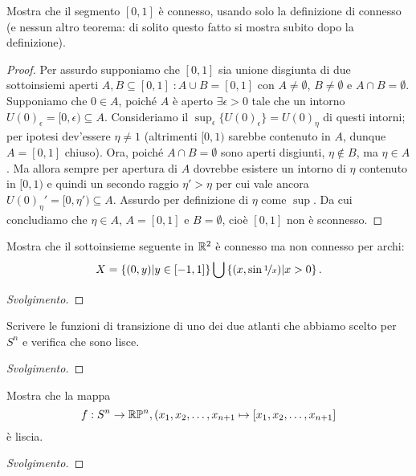 \documentclass{article}[a4paper, 12pt, italian]
\begin{document}
\begin{exercise}
Mostra che il segmento $[0, 1]$ è connesso, usando solo la definizione di
connesso (e nessun altro teorema: di solito questo fatto si mostra subito dopo
la definizione).
\begin{proof}
Per assurdo supponiamo che $[0, 1]$ sia unione disgiunta di due sottoinsiemi
aperti $A, B \subseteq [0, 1] \; : A \cup B = [0, 1]$ con
$A \neq \emptyset$, $B \neq \emptyset$ e $A \cap B = \emptyset$.
Supponiamo che $0 \in A$, poiché $A$ è aperto $\exists \epsilon > 0$
tale che un intorno $U(0)_\epsilon = [0, \epsilon) \subseteq A$.
Consideriamo il $\sup_\epsilon \{U(0)_\epsilon\} = U(0)_\eta$ di questi
intorni; per ipotesi dev'essere $\eta \neq 1$ (altrimenti $[0, 1)$ sarebbe
contenuto in $A$, dunque $A = [0, 1]$ chiuso). Ora, poiché 
$A \cap B = \emptyset$ sono aperti disgiunti, $\eta \not\in B$, ma
$\eta \in A$. Ma allora sempre per apertura di $A$ dovrebbe esistere un
intorno di $\eta$ contenuto in $[0, 1)$ e quindi un secondo raggio 
$\eta' > \eta$ per cui vale ancora $U(0)_\eta' = [0, \eta') \subseteq A$.
Assurdo per definizione di $\eta$ come $\sup$. Da cui concludiamo che
$\eta \in A$, $A = [0, 1]$ e $B = \emptyset$, cioè $[0, 1]$ non è
sconnesso.

\end{proof}
\end{exercise}

\begin{exercise}
Mostra che il sottoinsieme seguente in $\mathbb{R}^2$ è connesso ma non connesso per
archi:
\[
X = \left\{(0, y) | y \in [-1, 1]\right\} \bigcup
\left\{(x, \sin{\nicefrac{1}{x}}) | x > 0\right\}
.\]
\begin{proof}[Svolgimento]

\end{proof}
\end{exercise}

\begin{exercise}
Scrivere le funzioni di transizione di uno dei due atlanti che abbiamo scelto
per $S^n$ e verifica che sono lisce.
\begin{proof}[Svolgimento]

\end{proof}
\end{exercise}

\begin{exercise}
Mostra che la mappa
\[
f: S^n \to \mathbb{R}\mathbb{P}^n, (x_1, x_2, \ldots, x_{n+1} \mapsto
[x_1, x_2, \ldots, x_{n+1}]
\]
è liscia.
\begin{proof}[Svolgimento]

\end{proof}
\end{exercise}
\end{document}

